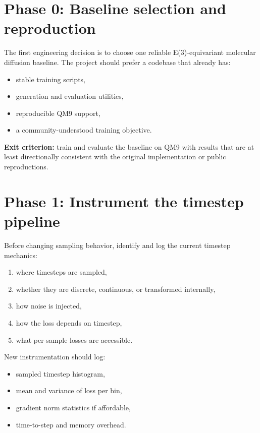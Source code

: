 \documentclass[11pt]{report}
\begin{document}
\section{Phase 0: Baseline selection and reproduction}

The first engineering decision is to choose one reliable E(3)-equivariant molecular diffusion baseline. The project should prefer a codebase that already has:

\begin{itemize}[leftmargin=2em]
    \item stable training scripts,
    \item generation and evaluation utilities,
    \item reproducible QM9 support,
    \item a community-understood training objective.
\end{itemize}

\textbf{Exit criterion:} train and evaluate the baseline on QM9 with results that are at least directionally consistent with the original implementation or public reproductions.

\section{Phase 1: Instrument the timestep pipeline}

Before changing sampling behavior, identify and log the current timestep mechanics:

\begin{enumerate}[leftmargin=2em]
    \item where timesteps are sampled,
    \item whether they are discrete, continuous, or transformed internally,
    \item how noise is injected,
    \item how the loss depends on timestep,
    \item what per-sample losses are accessible.
\end{enumerate}

New instrumentation should log:

\begin{itemize}[leftmargin=2em]
    \item sampled timestep histogram,
    \item mean and variance of loss per bin,
    \item gradient norm statistics if affordable,
    \item time-to-step and memory overhead.
\end{itemize}
\end{document}
